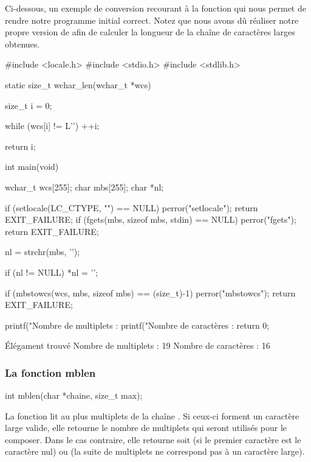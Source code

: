 Ci-dessous, un exemple de conversion recourant à la fonction
 qui nous permet de rendre notre programme initial
correct. Notez que nous avons dû réaliser notre propre version de
 afin de calculer la longueur de la chaîne de
caractères larges obtenues.

\begin{C}
#include <locale.h>
#include <stdio.h>
#include <stdlib.h>


static size_t
wchar_len(wchar_t *wcs)
{
    size_t i = 0;

    while (wcs[i] != L'\0')
        ++i;

    return i;
}


int main(void)
{
    wchar_t wcs[255];
    char mbs[255];
    char *nl;

    if (setlocale(LC_CTYPE, "") == NULL)
    {
        perror("setlocale");
        return EXIT_FAILURE;
    }
    if (fgets(mbs, sizeof mbs, stdin) == NULL)
    {
        perror("fgets");
        return EXIT_FAILURE;
    }

    nl = strchr(mbs, '\n');

    if (nl != NULL)
        *nl = '\0';

    if (mbstowcs(wcs, mbs, sizeof mbs) == (size_t)-1)
    {
        perror("mbstowcs");
        return EXIT_FAILURE;
    }

    printf("Nombre de multiplets : %
    printf("Nombre de caractères : %
    return 0;
}
\end{C}

\begin{C}
Élégament trouvé
Nombre de multiplets : 19
Nombre de caractères : 16
\end{C}

\subsubsection{La fonction mblen}
\label{la-fonction-mblen}

\begin{C}
int mblen(char *chaine, size_t max);
\end{C}

La fonction  lit au plus  multiplets de la
chaîne . Si ceux-ci forment un caractère large valide,
elle retourne le nombre de multiplets qui seront utilisés pour le
composer. Dans le cas contraire, elle retourne soit  (si le
premier caractère est le caractère nul) ou  (la suite de
multiplets ne correspond pas à un caractère large).


